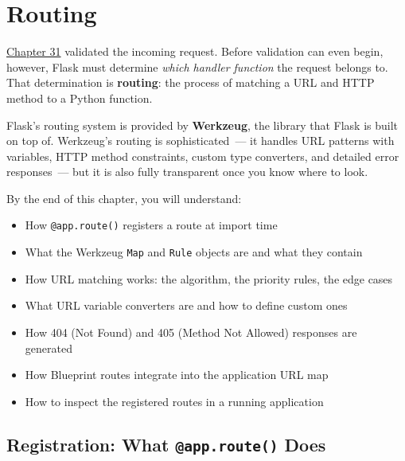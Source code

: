 \setcounter{chapter}{31}
\chapter{Routing}\label{ch:32-routing}

\chapterrule

\hyperref[ch:31-input-handling]{Chapter 31} validated the incoming request. Before validation can even begin, however, Flask must determine \emph{which handler function} the request belongs to. That determination is \textbf{routing}: the process of matching a URL and HTTP method to a Python function.

Flask's routing system is provided by \textbf{Werkzeug}, the library that Flask is built on top of. Werkzeug's routing is sophisticated~--- it handles URL patterns with variables, HTTP method constraints, custom type converters, and detailed error responses~--- but it is also fully transparent once you know where to look.

\begin{objectives}

By the end of this chapter, you will understand:

\begin{itemize}
\tightlist
\item
  How \texttt{@app.route()} registers a route at import time
\item
  What the Werkzeug \texttt{Map} and \texttt{Rule} objects are and what they contain
\item
  How URL matching works: the algorithm, the priority rules, the edge cases
\item
  What URL variable converters are and how to define custom ones
\item
  How 404 (Not Found) and 405 (Method Not Allowed) responses are generated
\item
  How Blueprint routes integrate into the application URL map
\item
  How to inspect the registered routes in a running application
\end{itemize}

\end{objectives}

\setcounter{section}{0}
\section{\texorpdfstring{Registration: What \texttt{@app.route()} Does}{Registration: What @app.route() Does}}\label{32-routing:321-registration-what-approute-does}

